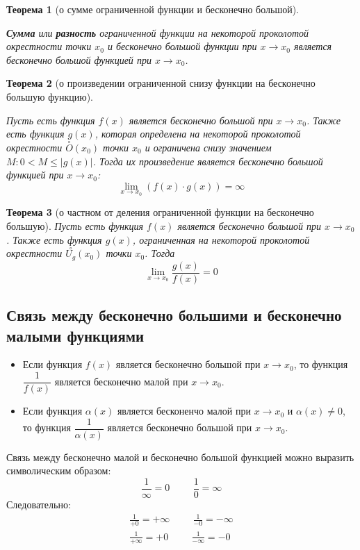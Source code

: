 \documentclass[a4paper,12pt,oneside]{extbook}
\newcommand{\newpar}{$ $\par\nobreak\ignorespaces}
\theoremstyle{numbered}
\theoremstyle{unnumbered}
\newtheorem*{theorem*}{Теорема}
\theoremstyle{named}
\theoremstyle{unnumbered}
\theoremstyle{named}
\theoremstyle{named}
\theoremstyle{named}
\begin{document}
\begin{theorem*}[о сумме ограниченной функции и бесконечно большой]
    \newpar
    \textbf{Сумма} или \textbf{разность} ограниченной функции на некоторой проколотой окрестности точки \(x_0\) и бесконечно большой функции при \(x \to x_0\) является бесконечно большой функцией при \(x \to x_0\).
\end{theorem*}

\begin{theorem*}[о произведении ограниченной снизу функции на бесконечно большую функцию]
    \newpar
    Пусть есть функция \(f(x)\) является бесконечно большой при \(x \to x_0\). Также есть функция \(g(x)\), которая определена на некоторой проколотой окрестности \(\overset{\circ}{O}(x_0)\) точки \(x_0\) и ограничена снизу значением \(M: 0 < M \leq |g(x)|\). Тогда их произведение является бесконечно большой функцией при \(x \to x_0\):
    \[
        \lim_{x \to x_0}{(f(x) \cdot g(x))} = \infty
    \]
\end{theorem*}

\begin{theorem*}[о частном от деления ограниченной функции на бесконечно большую]
    Пусть есть функция \(f(x)\) является бесконечно большой при \(x \to x_0\). Также есть функция \(g(x)\), ограниченная на некоторой проколотой окрестности \(\overset{\circ}{U_g}(x_0)\) точки \(x_0\). Тогда
    \[
        \lim_{x \to x_0}{\dfrac{g(x)}{f(x)}} = 0
    \]
\end{theorem*}

\subsection{Связь между бесконечно большими и бесконечно малыми функциями}
\label{sec:Связь между бесконечно большими и бесконечно малыми функциями}
\begin{itemize}
    \item {Если функция \(f(x)\) является бесконечно большой при \(x \to x_0\), то функция \(\dfrac{1}{f(x)}\) является бесконечно малой при \(x \to x_0\).}
    \item {Если функция \(\alpha(x)\)} является бесконенчо малой при \(x \to x_0\) и \(\alpha(x) \neq 0\), то функция \(\dfrac{1}{\alpha(x)}\) является бесконечно большой при \(x \to x_0\).
\end{itemize}

Связь между бесконечно малой и бесконечно большой функцией можно выразить символическим образом:
\[
    \frac{1}{\infty} = 0 \hspace{1cm} \frac{1}{0} = \infty
\]
Следовательно:
\begin{gather*}
    \frac{1}{+0} = +\infty \hspace{1cm} \frac{1}{-0} = -\infty \\
    \frac{1}{+ \infty} = +0 \hspace{1cm} \frac{1}{-\infty} = -0
\end{gather*}
\end{document}
